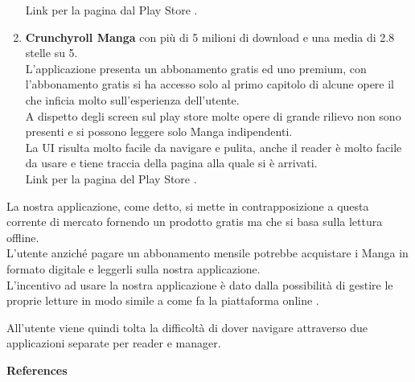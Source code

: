 \documentclass{report}
\begin{document}
\begin{enumerate}
  Link per la pagina dal Play Store .
\item
  \textbf{Crunchyroll Manga} con più di 5 milioni di download e una
  media di 2.8 stelle su 5.\\
  L'applicazione presenta un abbonamento gratis ed uno premium, con
  l'abbonamento gratis si ha accesso solo al primo capitolo di alcune
  opere il che inficia molto sull'esperienza dell'utente.\\
  A dispetto degli screen sul play store molte opere di grande rilievo
  non sono presenti e si possono leggere solo Manga indipendenti.\\
  La UI risulta molto facile da navigare e pulita, anche il reader è
  molto facile da usare e tiene traccia della pagina alla quale si è
  arrivati.\\
  Link per la pagina del Play Store .
\end{enumerate}

La nostra applicazione, come detto, si mette in contrapposizione a
questa corrente di mercato fornendo un prodotto gratis ma che si basa
sulla lettura offline.\\
L'utente anziché pagare un abbonamento mensile potrebbe acquistare i
Manga in formato digitale e leggerli sulla nostra applicazione.\\
L'incentivo ad usare la nostra applicazione è dato dalla possibilità di
gestire le proprie letture in modo simile a come fa la piattaforma
online .

All'utente viene quindi tolta la difficoltà di dover navigare attraverso
due applicazioni separate per reader e manager.

\textbf{References}

 

\end{document}
